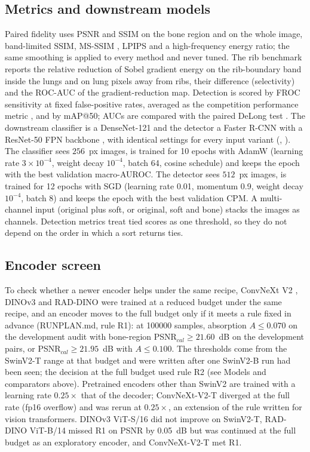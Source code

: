 \subsection{Metrics and downstream models}
Paired fidelity uses PSNR and SSIM \citep{wang2004ssim} on the bone region and on the whole image, band-limited SSIM, MS-SSIM \citep{wang2003msssim}, LPIPS \citep{zhang2018lpips}
and a high-frequency energy ratio; the same smoothing is applied to every method and never tuned. The rib benchmark reports the relative reduction of
Sobel gradient energy on the rib-boundary band inside the lungs and on lung pixels away from ribs, their difference (selectivity) and the ROC-AUC of the
gradient-reduction map. Detection is scored by FROC sensitivity at fixed false-positive rates, averaged as the competition performance metric
\citep{vanginneken2010anode09,niemeijer2011cpm}, and by mAP@50; AUCs are compared with the paired DeLong test \citep{delong1988auc}. The downstream classifier is a DenseNet-121
\citep{huang2017densenet} and the detector a Faster R-CNN with a ResNet-50 FPN backbone \citep{ren2017fasterrcnn}, with identical settings for every
input variant (, ). The classifier sees $256$~px images, is trained for 10 epochs with AdamW
\citep{loshchilov2019adamw} (learning rate $3\times10^{-4}$, weight decay $10^{-4}$, batch 64, cosine schedule) and keeps the epoch with the
best validation macro-AUROC. The detector sees $512$~px images, is trained for 12 epochs with SGD (learning rate 0.01, momentum 0.9, weight
decay $10^{-4}$, batch 8) and keeps the epoch with the best validation CPM. A multi-channel input (original plus soft, or original, soft and bone)
stacks the images as channels. Detection metrics treat tied scores as one threshold, so they do not depend on the order in which a sort
returns ties.

\subsection{Encoder screen}
To check whether a newer encoder helps under the same recipe, ConvNeXt V2 \citep{woo2023convnextv2}, DINOv3 \citep{simeoni2025dinov3} and RAD-DINO
\citep{perezgarcia2025raddino} were trained at a reduced budget under the same recipe, and an encoder moves to the full budget only if
it meets a rule fixed in advance (RUNPLAN.md, rule R1): at \num{100000} samples, absorption $A\le0.070$ on the development audit with
bone-region PSNR$_{cal}\ge21.60$~dB on the development pairs, or PSNR$_{cal}\ge21.95$~dB with $A\le0.100$. The thresholds come from the
SwinV2-T range at that budget and were written after one SwinV2-B run had been seen; the decision at the full budget used rule R2 (see Models and comparators above). Pretrained encoders other than SwinV2 are trained with a learning rate $0.25\times$ that of the decoder;
ConvNeXt-V2-T diverged at the full rate (fp16 overflow) and was rerun at $0.25\times$, an extension of the rule written for vision transformers.
DINOv3 ViT-S/16 did not improve on SwinV2-T, RAD-DINO ViT-B/14 missed R1 on PSNR by 0.05~dB but was continued at the full budget as an
exploratory encoder, and ConvNeXt-V2-T met R1.

